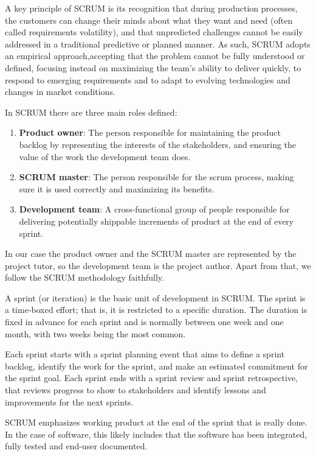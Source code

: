 \documentclass[a4paper, 12pt]{book}
\begin{document}
A key principle of SCRUM is its recognition that during production processes, the customers can change their minds about what they want and need (often called requirements volatility), and that unpredicted challenges cannot be easily addressed in a traditional predictive or planned manner. As such, SCRUM adopts an empirical approach,accepting that the problem cannot be fully understood or defined, focusing instead on maximizing the team's ability to deliver quickly, to respond to emerging requirements and to adapt to evolving technologies and changes in market conditions.

In SCRUM there are three main roles defined:	

\begin{enumerate}
\item \textbf{Product owner}: The person responsible for maintaining the product backlog by representing the interests of the stakeholders, and ensuring the value of the work the development team does.
\item \textbf{SCRUM master}: The person responsible for the scrum process, making sure it is used correctly and maximizing its benefits.
\item \textbf{Development team}: A cross-functional group of people responsible for delivering potentially shippable increments of product at the end of every sprint.
\end{enumerate}

In our case the product owner and the SCRUM master are represented by the project tutor, so the development team is the project author. Apart from that, we follow the SCRUM methodology faithfully.

A sprint (or iteration) is the basic unit of development in SCRUM. The sprint is a time-boxed effort; that is, it is restricted to a specific duration. The duration is fixed in advance for each sprint and is normally between one week and one month, with two weeks being the most common.

Each sprint starts with a sprint planning event that aims to define a sprint backlog, identify the work for the sprint, and make an estimated commitment for the sprint goal. Each sprint ends with a sprint review and sprint retrospective, that reviews progress to show to stakeholders and identify lessons and improvements for the next sprints.

SCRUM emphasizes working product at the end of the sprint that is really done. In the case of software, this likely includes that the software has been integrated, fully tested and end-user documented.
\end{document}
